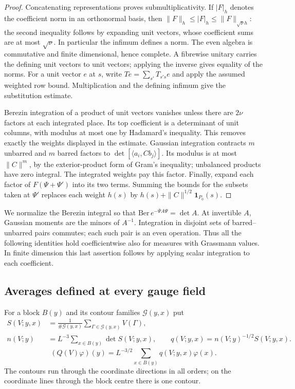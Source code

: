 \documentclass[11pt,letterpaper,reqno]{amsart}
\theoremstyle{definition}
\theoremstyle{remark}
\begin{document}
\begin{proof}
Concatenating representations proves submultiplicativity.  If
$|F|_h$ denotes the coefficient norm in an orthonormal basis, then
$\|F\|_h\le|F|_h\le\|F\|_{\sqrt\nu h}$: the second inequality
follows by expanding unit vectors, whose coefficient sums are at most
$\sqrt\nu$.  In particular the infimum defines a norm.  The even
algebra is commutative and finite dimensional, hence complete.
A fibrewise unitary carries the defining unit vectors to unit vectors;
applying the inverse gives equality of the norms.
For a unit vector $e$ at $s$, write $Te=\sum_{s'}T_{s's}e$ and apply
the assumed weighted row bound.  Multiplication and the defining
infimum give the substitution estimate.

Berezin integration of a product of unit vectors vanishes unless
there are $2\nu$ factors at each integrated place.  Its top coefficient
is a determinant of unit columns, with modulus at most one by
Hadamard's inequality.  This removes exactly the weights displayed
in the estimate.
Gaussian integration contracts $m$ unbarred and $m$ barred factors
to $\det[\langle a_i,Cb_j\rangle]$.  Its modulus is at most
$\|C\|^m$, by the exterior-product form of Gram's inequality;
unbalanced products have zero integral.  The integrated weights pay
this factor.  Finally, expand each factor of
$F(\Psi+\Psi')$ into its two terms.  Summing the bounds for the
subsets taken at $\Psi'$ replaces each weight $h(s)$ by
$h(s)+\|C\|^{1/2}\mathbf1_{P_0}(s)$.
\end{proof}

We normalize the Berezin integral so that
$\mathrm{Ber}\,e^{-\bar\Psi A\Psi}=\det A$.  At invertible $A$,
Gaussian moments are the minors of $A^{-1}$.  Integration in disjoint
sets of barred--unbarred pairs commutes; each such pair is an even
operation.  Thus all the following identities hold coefficientwise
also for measures with Grassmann values.  In finite dimension this
last assertion follows by applying scalar integration to each
coefficient.

\subsection{Averages defined at every gauge field}

For a block $B(y)$ and its contour families $\mathcal G(y,x)$ put
\[
 \begin{aligned}
 S(V;y,x)&=\frac1{\#\mathcal G(y,x)}\sum_{\Gamma\in\mathcal G(y,x)}V(\Gamma),\\
 n(V;y)&=L^{-3}\sum_{x\in B(y)}\det S(V;y,x),\qquad
 q(V;y,x)=n(V;y)^{-1/2}S(V;y,x).
 \end{aligned}
\]
\[
 (Q(V)\varphi)(y)=L^{-3/2}\sum_{x\in B(y)}q(V;y,x)\varphi(x).
\]
The contours run through the coordinate directions in all orders;
on the coordinate lines through the block centre there is one contour.
\end{document}
